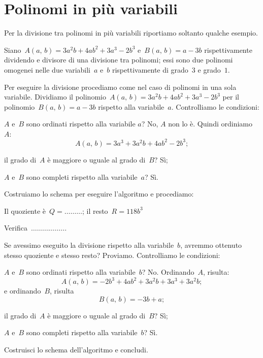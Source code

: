 \section{Polinomi in più variabili}
Per la divisione tra polinomi in più variabili riportiamo soltanto qualche esempio.
\begin{exrig}
 \begin{esempio}
Siano~$A(a\text{,~}b)=3a^{2}b+4ab^{2}+3a^{3}-2b^{3}$ e~$B(a\text{,~}b)=a-3b$ rispettivamente dividendo e divisore di una divisione tra polinomi;
essi sono due polinomi omogenei nelle due variabili~$a$ e~$b$ rispettivamente di grado~$3$ e grado~$1$.

Per eseguire la divisione procediamo come nel caso di polinomi in una sola variabile.
Dividiamo il polinomio~$A(a\text{,~}b)=3a^{2}b+4ab^{2}+3a^{3}-2b^{3}$ per il polinomio~$B(a\text{,~}b)=a-3b$ rispetto alla variabile~$a$.
Controlliamo le condizioni:
\begin{itemize*}
\item $A$ e~$B$ sono ordinati rispetto alla variabile $a$? No, $A$ non lo è. Quindi ordiniamo~$A$:
\[A(a\text{,~}b)=3a^{3}+3a^{2}b+4ab^{2}-2b^{3};\]
\item il grado di~$A$ è maggiore o uguale al grado di~$B$? Sì;
\item $A$ e~$B$ sono completi rispetto alla variabile~$a$? Sì.
\end{itemize*}
Costruiamo lo schema per eseguire l'algoritmo e procediamo:
\begin{center}
 
\end{center}
Il quoziente è~$Q =\ldots \ldots \ldots$; il resto~$R = 118b^{3}$

Verifica~$\ldots \ldots \ldots \ldots \ldots \ldots$

Se avessimo eseguito la divisione rispetto alla variabile~$b$, avremmo ottenuto stesso quoziente e stesso resto? Proviamo.
Controlliamo le condizioni:
\begin{itemize*}
\item $A$ e~$B$ sono ordinati rispetto alla variabile~$b$? No. Ordinando~$A$, risulta:
\[A(a\text{,~}b)=-2b^{3}+4ab^{2}+3a^{2}b+3a^{3}+3a^{2}b;\]
e ordinando~$B$, risulta
\[B(a\text{,~}b)=-3b+a;\]
\item il grado di~$A$ è maggiore o uguale al grado di~$B$? Sì;
\item $A$ e~$B$ sono completi rispetto alla variabile~$b$? Sì.
\end{itemize*}
Costruisci lo schema dell'algoritmo e concludi.
 \end{esempio}
\end{exrig}
\ovalbox{\risolvii \ref{ese:12.6}, \ref{ese:12.7}}

